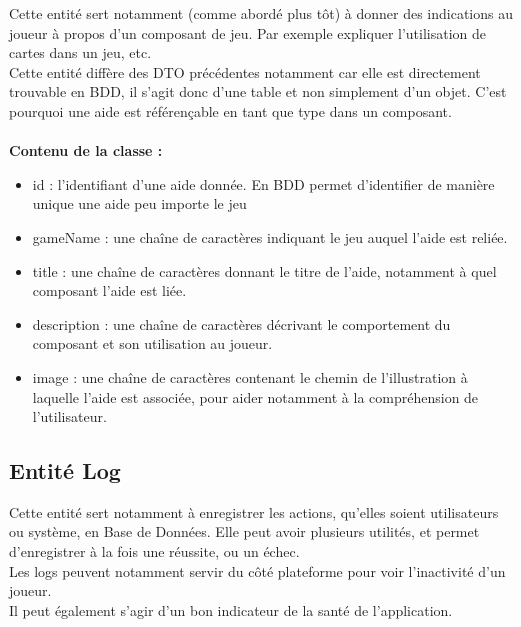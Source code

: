 \documentclass{article}
\begin{document}
            Cette entité sert notamment (comme abordé plus tôt) à donner des indications au joueur à propos d'un composant de jeu. Par exemple expliquer l'utilisation de cartes dans un jeu, etc.\\
            \indent Cette entité diffère des DTO précédentes notamment car elle est directement trouvable en BDD, il s'agit donc d'une table et non simplement d'un objet. C'est pourquoi une aide est référençable en tant que type dans un composant.\\
            \\
            \textbf{Contenu de la classe :}
                \begin{itemize}
                    \item id : l'identifiant d'une aide donnée. En BDD permet d'identifier de manière unique une aide peu importe le jeu
                    \item gameName : une chaîne de caractères indiquant le jeu auquel l'aide est reliée.
                    \item title : une chaîne de caractères donnant le titre de l'aide, notamment à quel composant l'aide est liée. 
                    \item description : une chaîne de caractères décrivant le comportement du composant et son utilisation au joueur.
                    \item image : une chaîne de caractères contenant le chemin de l'illustration à laquelle l'aide est associée, pour aider notamment à la compréhension de l'utilisateur.
                \end{itemize}

        \subsection{Entité Log}

            Cette entité sert notamment à enregistrer les actions, qu'elles soient utilisateurs ou système, en Base de Données. Elle peut avoir plusieurs utilités, et permet d'enregistrer à la fois une réussite, ou un échec. \\
            \indent Les logs peuvent notamment servir du côté plateforme pour voir l'inactivité d'un joueur.\\
            \indent Il peut également s'agir d'un bon indicateur de la santé de l'application.\\
\end{document}
